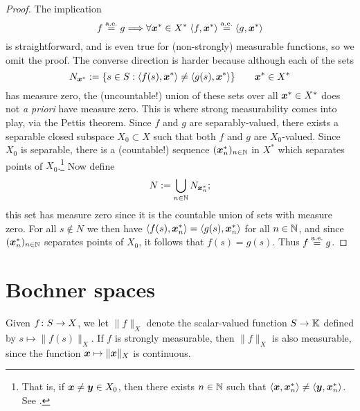 \begin{proof}
  The implication
  \begin{equation*}
    f \stackrel{\mathrm{a.e.}}{=}g \Longrightarrow \forall \bm{x}^* \in X^* \;  \langle f, \bm{x}^* \rangle \stackrel{\mathrm{a.e.}}{=} \langle g, \bm{x}^* \rangle
  \end{equation*}
  is straightforward, and is even true for (non-strongly) measurable functions, so we omit the proof.
  The converse direction is harder because although each of the sets
  \begin{equation*}
    N_{\bm{x}^*} := \{s \in S : \langle f(s), \bm{x}^* \rangle \neq \langle g(s), \bm{x}^* \rangle\} \qquad \bm{x}^* \in X^*
  \end{equation*}
  has measure zero, the (uncountable!) union of these sets over all $\bm{x}^* \in X^*$ does not \emph{a priori} have measure zero.
  This is where strong measurability comes into play, via the Pettis theorem.
  Since $f$ and $g$ are separably-valued, there exists a separable closed subspace $X_0 \subset X$ such that both $f$ and $g$ are $X_0$-valued.
  Since $X_0$ is separable, there is a (countable!) sequence $(\bm{x}_n^*)_{n \in \mathbb{N}}$ in $X^*$ which separates points of $X_0$.\footnote{That is, if $\bm{x} \neq \bm{y} \in X_0$, then there exists $n \in \mathbb{N}$ such that $\langle \bm{x}, \bm{x}_n^* \rangle \neq \langle \bm{y}, \bm{x}_n^* \rangle$. See \cite[Proposition B.1.11]{HNVW16}.}
  Now define
  \begin{equation*}
    N := \bigcup_{n \in \mathbb{N}} N_{\bm{x}_n^*};
  \end{equation*}
  this set has measure zero since it is the countable union of sets with measure zero.
  For all $s \notin N$ we then have $\langle f(s), \bm{x}_n^* \rangle = \langle g(s), \bm{x}_n^* \rangle$ for all $n \in \mathbb{N}$, and since $(\bm{x}_n^*)_{n \in \mathbb{N}}$ separates points of $X_0$, it follows that $f(s) = g(s)$.
  Thus $f \stackrel{\mathrm{a.e.}}{=} g$.  
\end{proof}



\section{Bochner spaces}

Given $f \colon S \rightarrow X$, we let $\|f\|_X$ denote the scalar-valued function $S \to \mathbb{K}$ defined by $s \mapsto \|f(s)\|_X$.
If $f$ is strongly measurable, then $\|f\|_X$ is also measurable, since the function $\bm{x} \mapsto \|\bm{x}\|_X$ is continuous.

